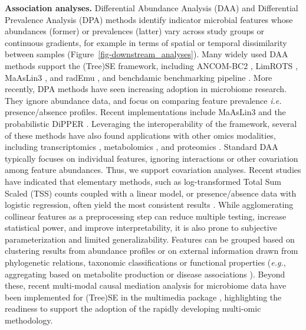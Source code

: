 \documentclass[
  sn-nature,
]{sn-jnl}
\begin{document}
\textbf{Association analyses.} Differential Abundance Analysis (DAA) and
Differential Prevalence Analysis (DPA) methods identify indicator
microbial features whose abundances (former) or prevalences (latter)
vary across study groups or continuous gradients, for example in terms
of spatial or temporal dissimilarity between samples
(Figure~\ref{fig-downstream_analyses}). Many widely used DAA methods
support the (Tree)SE framework, including ANCOM-BC2 \citep{lin2024},
LimROTS \citep{anwar2025}, MaAsLin3 \citep{nickols2026}, and radEmu
\citep{clausen2026}, and benchdamic benchmarking pipeline
\citep{calgaro2022}. More recently, DPA methods have seen increasing
adoption in microbiome research. They ignore abundance data, and focus
on comparing feature prevalence \emph{i.e.} presence/absence profiles.
Recent implementations include MaAsLin3 \citep{nickols2026} and the
probabilistic DiPPER \citep{pelto2026}. Leveraging the interoperability
of the framework, several of these methods have also found applications
with other omics modalities, including transcriptomics \citep{love2014},
metabolomics \citep{nickols2026}, and proteomics \citep{anwar2025}.
Standard DAA typically focuses on individual features, ignoring
interactions or other covariation among feature abundances. Thus, we
support covariation analyses. Recent studies have indicated that
elementary methods, such as log-transformed Total Sum Scaled (TSS)
counts coupled with a linear model, or presence/absence data with
logistic regression, often yield the most consistent results
\citep{pelto2025, gamboa-tuz2025}. While agglomerating collinear
features as a preprocessing step can reduce multiple testing, increase
statistical power, and improve interpretability, it is also prone to
subjective parameterization and limited generalizability. Features can
be grouped based on clustering results from abundance profiles or on
external information drawn from phylogenetic relations, taxonomic
classifications or functional properties (\emph{e.g.}, aggregating based
on metabolite production \citep{kullberg2024} or disease associations
\citep{geistlinger2024}). Beyond these, recent multi-modal causal
mediation analysis for microbiome data have been implemented for
(Tree)SE in the multimedia package \citep{jiang2025}, highlighting the
readiness to support the adoption of the rapidly developing multi-omic
methodology.
\end{document}
